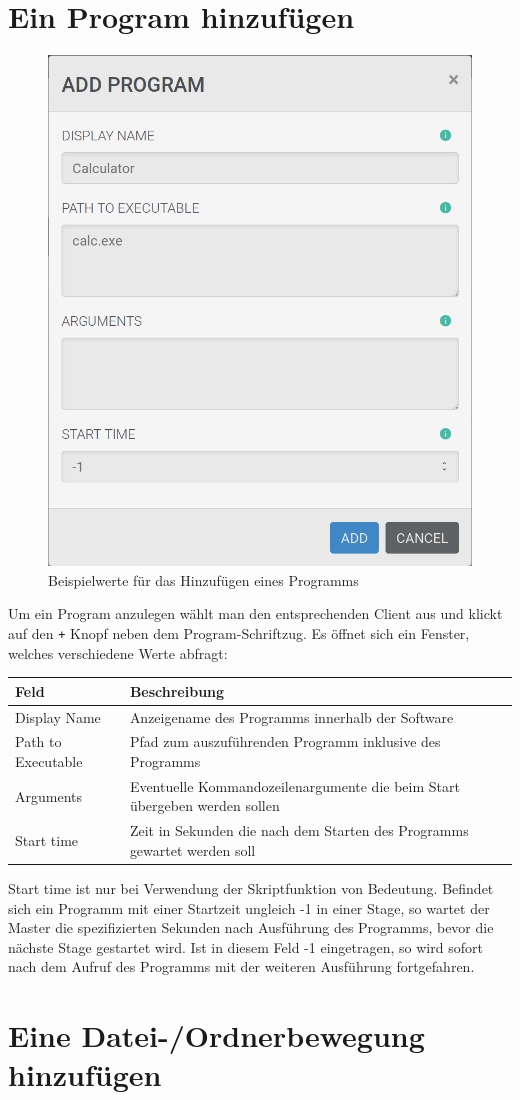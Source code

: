 \documentclass[accentcolor=tud1c, paper=a4, colorback]{tudreport}
\begin{document}
	\section{Ein Program hinzufügen}
	\begin{figure}[h]
		\centering
		\includegraphics[width=.4\textwidth]{add_program}
		\caption{Beispielwerte für das Hinzufügen eines Programms}
	\end{figure}
	Um ein Program anzulegen wählt man den entsprechenden Client aus und klickt auf
	den \texttt{+} Knopf neben dem Program-Schriftzug. Es öffnet sich ein Fenster,
	welches verschiedene Werte abfragt:\\
	\begin{center}
	\begin{tabular}{l|l}
		Feld & Beschreibung \\\hline
		Display Name &  Anzeigename des Programms innerhalb der Software\\
		Path to Executable & Pfad zum auszuführenden Programm inklusive des Programms\\
		Arguments & Eventuelle Kommandozeilenargumente die beim Start übergeben werden sollen\\
		Start time & Zeit in Sekunden die nach dem Starten des Programms gewartet werden soll\\

	\end{tabular}
	\end{center}
	Start time ist nur bei Verwendung der Skriptfunktion von Bedeutung.
	Befindet sich ein Programm mit einer Startzeit ungleich -1 in einer Stage,
	so wartet der Master die spezifizierten Sekunden nach Ausführung des Programms,
	bevor die nächste Stage gestartet wird. Ist in diesem Feld -1 eingetragen, so
	wird sofort nach dem Aufruf des Programms mit der weiteren Ausführung fortgefahren.

	\section{Eine Datei-/Ordnerbewegung hinzufügen}
\end{document}
